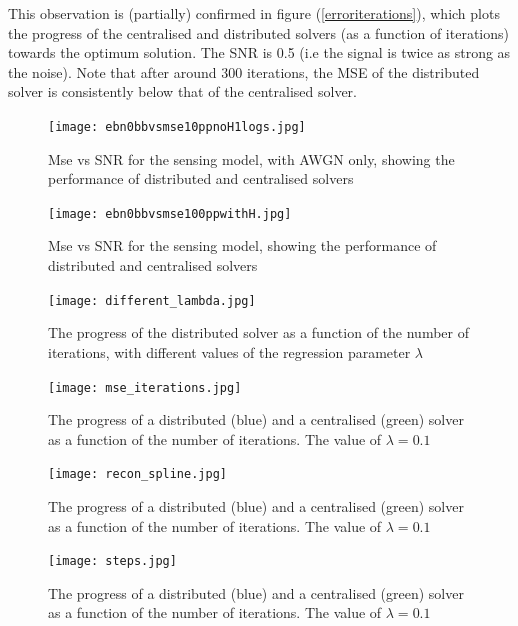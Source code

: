 This observation is (partially) confirmed in figure (\ref{erroriterations}), which plots the progress of the centralised and distributed solvers (as a function of iterations) towards the optimum solution. The SNR is 0.5 (i.e the signal is twice as strong as the noise). Note that after around 300 iterations, the MSE of the distributed solver is consistently below that of the centralised solver.

\begin{figure}[h]
\centering
\texttt{[image: ebn0bbvsmse10ppnoH1logs.jpg]}
\caption{Mse vs SNR for the sensing model, with AWGN only, showing the performance of distributed and centralised solvers}
\label{msevssnr0}
\end{figure}

\begin{figure}[h]
\centering
\texttt{[image: ebn0bbvsmse100ppwithH.jpg]}
\caption{Mse vs SNR for the sensing model, showing the performance of distributed and centralised solvers}
\label{msevssnr1}
\end{figure}

\begin{figure}[h]
\centering
\texttt{[image: different\_lambda.jpg]}
\caption{The progress of the distributed solver as a function of the number of iterations, with different values of the regression parameter \(\lambda\)}
\label{fig:differentLambda}
\end{figure}

\begin{figure}[h]
\centering
\texttt{[image: mse\_iterations.jpg]}
\caption{The progress of a distributed (blue) and a centralised (green) solver as a function of the number of iterations. The value of \(\lambda = 0.1\)}
\label{fig:erroriterations}
\end{figure}

\begin{figure}[h]
\centering
\texttt{[image: recon\_spline.jpg]}
\caption{The progress of a distributed (blue) and a centralised (green) solver as a function of the number of iterations. The value of \(\lambda = 0.1\)}
\label{fig:spline_recon}
\end{figure}

\begin{figure}[h]
\centering
\texttt{[image: steps.jpg]}
\caption{The progress of a distributed (blue) and a centralised (green) solver as a function of the number of iterations. The value of \(\lambda = 0.1\)}
\label{fig:steps_wavelets}
\end{figure}

